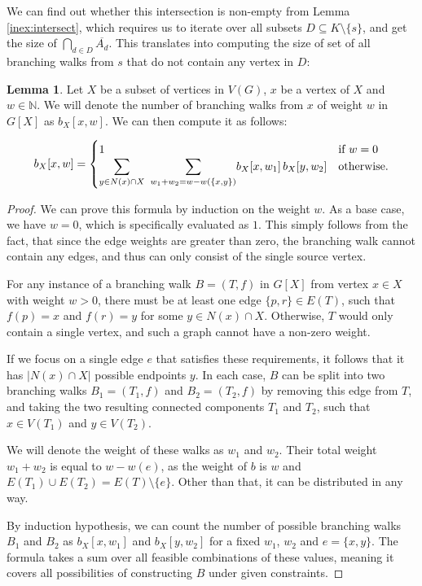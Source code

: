 \documentclass[thesis=M,english,hidelinks]{FITthesis}[2012/10/20]
\theoremstyle{definition}
\newtheorem{lemma}{Lemma}
\begin{document}
We can find out whether this intersection is non-empty from Lemma \ref{inex:intersect}, which requires us to iterate
over all subsets $D \subseteq K \setminus \{s\}$, and get the size of $\bigcap_{d \in D} \overline{A_d}$. This
translates into computing the size of set of all branching walks from $s$ that do not contain any vertex in $D$:

\begin{lemma}
    \label{nederlof:formula}
    Let $X$ be a subset of vertices in $V(G)$, $x$ be a vertex of $X$ and $w \in \mathbb{N}$. We will denote the number
    of branching walks from $x$ of weight $w$ in $G[X]$ as $b_X[x, w]$. We can then compute it as follows:

    $$
    b_X[x, w] =
    \begin{cases}
        1 & \text{if}\ w = 0 \\
        \mathlarger{\sum_{y \in N(x) \cap X}\ \sum_{w_1 + w_2 = w - w(\{x, y\})}} b_X[x, w_1]\,b_X[y, w_2] &
        \text{otherwise}. \\
    \end{cases}
    $$
\end{lemma}

\begin{proof}
    We can prove this formula by induction on the weight $w$. As a base case, we have $w = 0$, which is specifically
    evaluated as $1$. This simply follows from the fact, that since the edge weights are greater than zero, the branching
    walk cannot contain any edges, and thus can only consist of the single source vertex.

    For any instance of a branching walk $B = (T, f)$ in $G[X]$ from vertex $x \in X$ with weight $w > 0$, there must be at
    least one edge $\{p, r\} \in E(T)$, such that $f(p) = x$ and $f(r) = y$ for some $y \in N(x) \cap X$. Otherwise, $T$
    would only contain a single vertex, and such a graph cannot have a non-zero weight.

    If we focus on a single edge $e$ that satisfies these requirements, it follows that it has $\lvert N(x) \cap X
    \rvert$ possible endpoints $y$. In each case, $B$ can be split into two branching walks $B_1 = (T_1, f)$ and $B_2 =
    (T_2, f)$ by removing this edge from $T$, and taking the two resulting connected components $T_1$ and $T_2$, such
    that $x \in V(T_1)$ and $y \in V(T_2)$.
    
    We will denote the weight of these walks as $w_1$ and $w_2$. Their total weight $w_1 + w_2$ is equal to $w - w(e)$,
    as the weight of $b$ is $w$ and $E(T_1) \cup E(T_2) = E(T) \setminus \{e\}$. Other than that, it can be distributed
    in any way.

    By induction hypothesis, we can count the number of possible branching walks $B_1$ and $B_2$ as $b_X[x, w_1]$ and
    $b_X[y, w_2]$ for a fixed $w_1$, $w_2$ and $e = \{x, y\}$. The formula takes a sum over all feasible combinations of
    these values, meaning it covers all possibilities of constructing $B$ under given constraints.
\end{proof}
\end{document}
